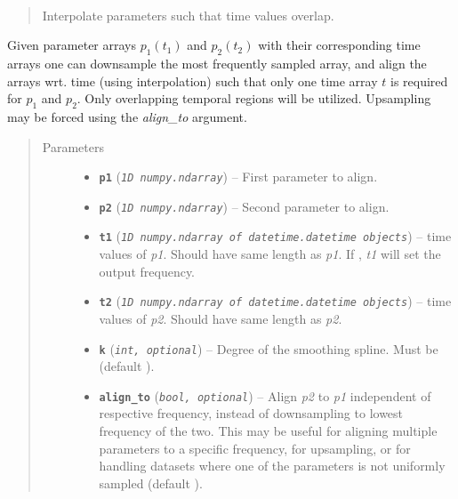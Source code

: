 \documentclass[letterpaper,10pt,english]{sphinxhowto}
\begin{document}

\begin{fulllineitems}
\label{swtools_doc:swtools.align_param}~\label{swtools_doc:align-param}\begin{quote}

Interpolate parameters such that time values overlap.
\end{quote}

Given parameter arrays \(p_1(t_1)\) and \(p_2(t_2)\) with
their corresponding time arrays one can downsample the most
frequently sampled array, and align the arrays wrt. time (using
interpolation) such that only one time array \(t\) is required
for \(p_1\) and \(p_2\). Only overlapping temporal regions
will be utilized. Upsampling may be forced using the \emph{align\_to}
argument.
\begin{quote}\begin{description}
\item[{Parameters}] \leavevmode\begin{itemize}
\item {} 
\textbf{\texttt{p1}} (\emph{\texttt{1D numpy.ndarray}}) -- First parameter to align.

\item {} 
\textbf{\texttt{p2}} (\emph{\texttt{1D numpy.ndarray}}) -- Second parameter to align.

\item {} 
\textbf{\texttt{t1}} (\emph{\texttt{1D numpy.ndarray of datetime.datetime objects}}) -- time values of \emph{p1}. Should have same length as \emph{p1}. If
, \emph{t1} will set the output frequency.

\item {} 
\textbf{\texttt{t2}} (\emph{\texttt{1D numpy.ndarray of datetime.datetime objects}}) -- time values of \emph{p2}. Should have same length as \emph{p2}.

\item {} 
\textbf{\texttt{k}} (\emph{\texttt{int, optional}}) -- Degree of the smoothing spline. Must be 
(default ).

\item {} 
\textbf{\texttt{align\_to}} (\emph{\texttt{bool, optional}}) -- Align \emph{p2} to \emph{p1} independent of respective frequency, instead of
downsampling to lowest frequency of the two. This may be useful for
aligning multiple parameters to a specific frequency, for
upsampling, or for handling datasets where one of the parameters is
not uniformly sampled (default ).


\end{itemize}
\end{description}
\end{quote}
\end{fulllineitems}
\end{document}
